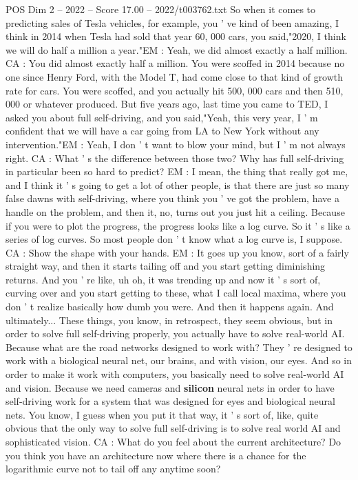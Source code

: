 \begin{textsample}{POS Dim 2 – 2022 – Score 17.00 – 2022/t003762.txt}
So when it comes to predicting sales of Tesla vehicles, for example, you ' ve kind of been amazing, I think in 2014 when Tesla had sold that year 60, 000 cars, you said,"2020, I think we will do half a million a year."EM : Yeah, we did almost exactly a half million.
CA : You did almost exactly half a million.
You were scoffed in 2014 because no one since Henry Ford, with the Model T, had come close to that kind of growth rate for cars.
You were scoffed, and you actually hit 500, 000 cars and then 510, 000 or whatever produced.
But five years ago, last time you came to TED, I asked you about full self-driving, and you said,"Yeah, this very year, I ' m confident that we will have a car going from LA to New York without any intervention."EM : Yeah, I don ' t want to blow your mind, but I ' m not always right.
CA : What ' s the difference between those two?
Why has full self-driving in particular been so hard to predict?
EM : I mean, the thing that really got me, and I think it ' s going to get a lot of other people, is that there are just so many false dawns with self-driving, where you think you ' ve got the problem, have a handle on the problem, and then it, no, turns out you just hit a ceiling.
Because if you were to plot the progress, the progress looks like a log curve.
So it ' s like a series of log curves.
So most people don ' t know what a log curve is, I suppose.
CA : Show the shape with your hands.
EM : It goes up you know, sort of a fairly straight way, and then it starts tailing off and you start getting diminishing returns.
And you ' re like, uh oh, it was trending up and now it ' s sort of, curving over and you start getting to these, what I call local maxima, where you don ' t realize basically how dumb you were.
And then it happens again.
And ultimately...
These things, you know, in retrospect, they seem obvious, but in order to solve full self-driving properly, you actually have to solve real-world AI.
Because what are the road networks designed to work with?
They ' re designed to work with a biological neural net, our brains, and with vision, our eyes.
And so in order to make it work with computers, you basically need to solve real-world AI and vision.
Because we need cameras and \textbf{silicon} neural nets in order to have self-driving work for a system that was designed for eyes and biological neural nets.
You know, I guess when you put it that way, it ' s sort of, like, quite obvious that the only way to solve full self-driving is to solve real world AI and sophisticated vision.
CA : What do you feel about the current architecture?
Do you think you have an architecture now where there is a chance for the logarithmic curve not to tail off any anytime soon?

\end{textsample}
